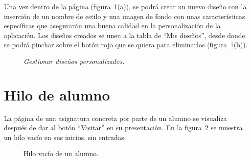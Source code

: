 \documentclass[a4paper, 12pt]{book}
\begin{document}
Una vez dentro de la p\'agina (figura~\ref{fig:persondiseno}(a)), se podr\'a crear un nuevo dise\~no con la inserci\'on de un nombre de estilo y una imagen de fondo
con unas caracter\'isticas espec\'ificas que asegurar\'an una buena calidad en la personalizaci\'on de la aplicaci\'on. Los dise\~nos
creados se unen a la tabla de ``Mis dise\~nos'', desde donde se podr\'a pinchar sobre el bot\'on rojo que se quiera para eliminarlos (figura~\ref{fig:persondiseno}(b)).
\begin{figure}
  \centering
  \caption{\textit{Gestionar dise\~nos personalizados.}}
  \label{fig:persondiseno}
\end{figure}

\section{Hilo de alumno}
\label{app:hiloalumno}
La p\'agina de una asignatura concreta por parte de un alumno se visualiza despu\'es de dar al bot\'on ``Visitar'' en su presentaci\'on. En la 
figura~\ref{figura:hiloalumno} se muestra un hilo vac\'io en sus inicios, sin entradas.
\begin{figure}[htbp] 
  \centering
  \caption{Hilo vac\'io de un alumno.}
  \label{figura:hiloalumno}
\end{figure}
\end{document}
